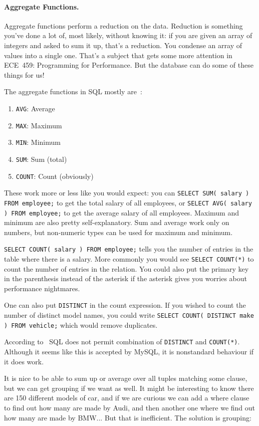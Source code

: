\documentclass[a4paper]{report}
\begin{document}
\paragraph{Aggregate Functions.} Aggregate functions perform a reduction on the data. Reduction is something you've done a lot of, most likely, without knowing it: if you are given an array of integers and asked to sum it up, that's a reduction. You condense an array of values into a single one. That's a subject that gets some more attention in ECE~459: Programming for Performance. But the database can do some of these things for us!

The aggregate functions in SQL mostly are~\cite{dsc}:
\begin{enumerate}
	\item \texttt{AVG}: Average 
	\item \texttt{MAX}: Maximum
	\item \texttt{MIN}: Minimum
	\item \texttt{SUM}: Sum (total)
	\item \texttt{COUNT}: Count (obviously)
\end{enumerate}

These work more or less like you would expect: you can \texttt{SELECT SUM( salary ) FROM employee;} to get the total salary of all employees, or \texttt{SELECT AVG( salary ) FROM employee;} to get the average salary of all employees. Maximum and minimum are also pretty self-explanatory. Sum and average work only on numbers, but non-numeric types can be used for maximum and minimum. 

\texttt{SELECT COUNT( salary ) FROM employee;} tells you the number of entries in the table where there is a salary. More commonly you would see \texttt{SELECT COUNT(*)} to count the number of entries in the relation. You could also put the primary key in the parenthesis instead of the asterisk if the asterisk gives you worries about performance nightmares.

One can also put \texttt{DISTINCT} in the count expression. If you wished to count the number of distinct model names, you could write \texttt{SELECT COUNT( DISTINCT make ) FROM vehicle;} which would remove duplicates.

According to~\cite{dsc} SQL does not permit combination of \texttt{DISTINCT} and \texttt{COUNT(*)}. Although it seems like this is accepted by MySQL, it is nonstandard behaviour if it does work. 

It is nice to be able to sum up or average over all tuples matching some clause, but we can get grouping if we want as well. It might be interesting to know there are 150 different models of car, and if we are curious we can add a where clause to find out how many are made by Audi, and then another one where we find out how many are made by BMW... But that is inefficient. The solution is grouping:
\end{document}

